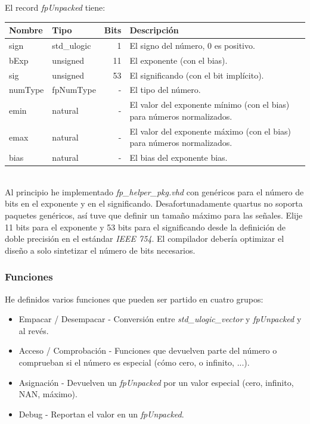 \documentclass[a4paper]{article}
\begin{document}
El record \textit{fpUnpacked} tiene:

\begin{tabular}{| l | l | r | p{10cm} |}
\hline
\textbf{Nombre} & \textbf{Tipo} & \textbf{Bits} & \textbf{Descripción} \\ \hline
sign & std\_ulogic & 1 & El signo del número, 0 es positivo. \\
bExp & unsigned & 11 & El exponente (con el bias). \\
sig & unsigned & 53 & El significando (con el bit implícito). \\
numType & fpNumType & - & El tipo del número. \\
emin & natural & - & El valor del exponente mínimo (con el bias) para números normalizados. \\
emax & natural & - & El valor del exponente máximo (con el bias) para números normalizados. \\
bias & natural & - & El bias del exponente bias. \\
\hline
\end{tabular} \\

Al principio he implementado \textit{fp\_helper\_pkg.vhd} con genéricos para el número de bits en el exponente y en el significando. Desafortunadamente quartus no soporta paquetes genéricos, así tuve que definir un tamaño máximo para las señales. Elije 11 bits para el exponente y 53 bits para el significando desde la definición de doble precisión en el estándar \textit{IEEE 754}. El compilador debería optimizar el diseño a solo sintetizar el número de bits necesarios.

\subsubsection{Funciones}

He definidos varios funciones que pueden ser partido en cuatro grupos:
\begin{itemize}[noitemsep]
\item Empacar / Desempacar - Conversión entre \textit{std\_ulogic\_vector} y \textit{fpUnpacked} y al revés.
\item Acceso / Comprobación - Funciones que devuelven parte del número o comprueban si el número es especial (cómo cero, o infinito, ...).
\item Asignación - Devuelven un \textit{fpUnpacked} por un valor especial (cero, infinito, NAN, máximo).
\item Debug - Reportan el valor en un \textit{fpUnpacked}.
\end{itemize}
\end{document}
